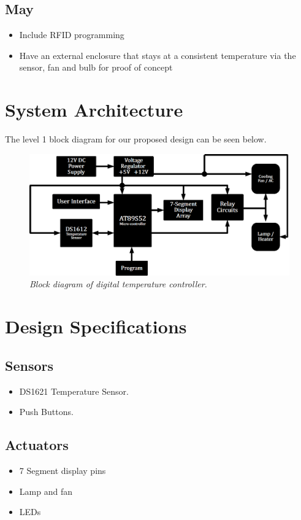 \documentclass[11pt]{article}
\begin{document}
	
\subsection*{May}

\begin{itemize}
    \item Include RFID programming
\item Have an external enclosure that stays at a consistent temperature via the sensor, fan and bulb for proof of concept

\end{itemize}

\section*{System Architecture}
The level 1 block diagram for our proposed design can be seen below.
	
	\begin{figure}[H]
	\centering
	\includegraphics[width=7in]{images/TCU}
		\caption{\textit{Block diagram of digital temperature controller.}}
	\end{figure}

\section*{Design Specifications}

\subsection*{Sensors}
\begin{itemize}
    \item DS1621 Temperature Sensor.
    \item Push Buttons.

\end{itemize}

\subsection*{Actuators}
\begin{itemize}
    \item 7 Segment display pins
 \item Lamp and fan
\item LEDs
\end{itemize}
\end{document}
